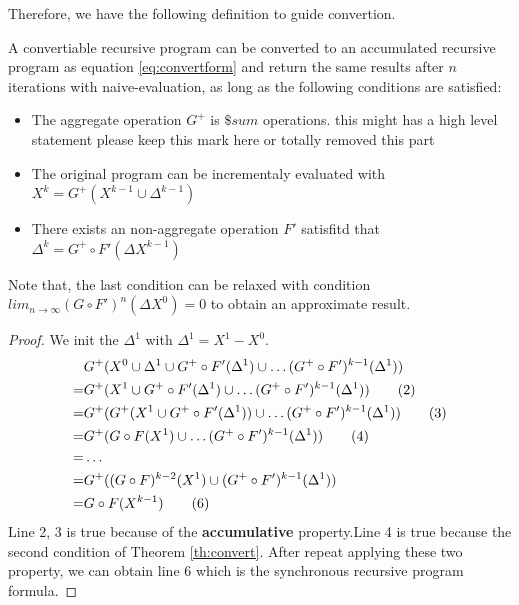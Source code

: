 Therefore, we have the following definition to guide convertion.
\begin{definition}
\label{th:convert}
A convertiable recursive program can be converted to an accumulated recursive program as equation \ref{eq:convertform} and return the same results after $n$ iterations with naive-evaluation, as long as the following conditions are satisfied:
\begin{itemize}
	\item The aggregate operation $G^+$ is $\$sum$ operations.{\color{blue} this  might has a high level statement please keep this mark here or totally removed this part}
	
	\item The original program can be incrementaly evaluated with $X^{k}=G^+(X^{k-1}\cup \Delta^{k-1})$
	\item There exists an non-aggregate operation $F'$ satisfitd that $\Delta^{k}=G^+\circ F'(\Delta X^{k-1})$
	
	
\end{itemize}
\end{definition}
{\color{green}
Note that, the last condition can be relaxed with condition $lim_{n\rightarrow\infty}(G\circ F')^n(\Delta X^0)=0$ to obtain an approximate result.
}
\begin{proof}
We init the $\Delta^1$ with $\Delta^1=X^1-X^0$.
\begin{align}
&G^+(X^0\cup \Delta^1 \cup G^+\circ F'(\Delta^1)\cup \ldots (G^+ \circ F')^{k-1}(\Delta^1 )) \notag\\
=&G^+(X^1 \cup G^+\circ F'(\Delta^1  )\cup \ldots (G^+ \circ F')^{k-1}(\Delta^1  )) \tag{2}\\
=&G^+(G^+(X^1\cup G^+\circ F'(\Delta^1  ))\cup \ldots (G^+ \circ F')^{k-1}(\Delta^1 )) \tag{3}\\
=&G^+(G\circ F(X^1)\cup \ldots (G^+ \circ F')^{k-1}(\Delta^1 )) \tag{4}\\
=&\ldots \notag\\
=&G^+((G\circ F)^{k-2}(X^1)\cup(G^+ \circ F')^{k-1}(\Delta^1 )) \notag\\
=&G\circ F(X^{k-1})\tag{6}
\end{align}
Line 2, 3 is true because of the \textbf{accumulative} property.Line 4 is true because the second condition of Theorem \ref{th:convert}. After repeat applying these two property, we can obtain line 6 which is the synchronous recursive program formula.
\end{proof}

